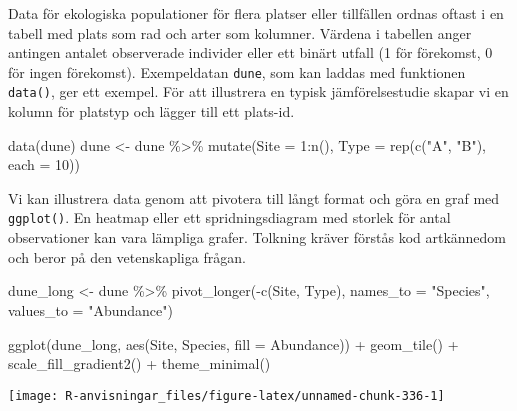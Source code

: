 \documentclass[
]{book}
\newenvironment{Shaded}{\begin{snugshade}}{\end{snugshade}}
\newcommand{\AttributeTok}[1]{\textcolor[rgb]{0.77,0.63,0.00}{#1}}
\newcommand{\DecValTok}[1]{\textcolor[rgb]{0.00,0.00,0.81}{#1}}
\newcommand{\FunctionTok}[1]{\textcolor[rgb]{0.00,0.00,0.00}{#1}}
\newcommand{\NormalTok}[1]{#1}
\newcommand{\OtherTok}[1]{\textcolor[rgb]{0.56,0.35,0.01}{#1}}
\newcommand{\SpecialCharTok}[1]{\textcolor[rgb]{0.00,0.00,0.00}{#1}}
\newcommand{\StringTok}[1]{\textcolor[rgb]{0.31,0.60,0.02}{#1}}
\theoremstyle{definition}
\theoremstyle{definition}
\theoremstyle{definition}
\theoremstyle{definition}
\theoremstyle{remark}
\begin{document}
Data för ekologiska populationer för flera platser eller tillfällen ordnas oftast i en tabell med plats som rad och arter som kolumner. Värdena i tabellen anger antingen antalet observerade individer eller ett binärt utfall (1 för förekomst, 0 för ingen förekomst). Exempeldatan \texttt{dune}, som kan laddas med funktionen \texttt{data()}, ger ett exempel. För att illustrera en typisk jämförelsestudie skapar vi en kolumn för platstyp och lägger till ett plats-id.

\begin{Shaded}
\begin{Highlighting}[]
\FunctionTok{data}\NormalTok{(dune)}
\NormalTok{dune }\OtherTok{\textless{}{-}}\NormalTok{ dune }\SpecialCharTok{\%\textgreater{}\%} 
  \FunctionTok{mutate}\NormalTok{(}\AttributeTok{Site =} \DecValTok{1}\SpecialCharTok{:}\FunctionTok{n}\NormalTok{(), }
         \AttributeTok{Type =} \FunctionTok{rep}\NormalTok{(}\FunctionTok{c}\NormalTok{(}\StringTok{"A"}\NormalTok{, }\StringTok{"B"}\NormalTok{), }\AttributeTok{each =} \DecValTok{10}\NormalTok{))}
\end{Highlighting}
\end{Shaded}

Vi kan illustrera data genom att pivotera till långt format och göra en graf med \texttt{ggplot()}. En heatmap eller ett spridningsdiagram med storlek för antal observationer kan vara lämpliga grafer. Tolkning kräver förstås kod artkännedom och beror på den vetenskapliga frågan.

\begin{Shaded}
\begin{Highlighting}[]
\NormalTok{dune\_long }\OtherTok{\textless{}{-}}\NormalTok{ dune }\SpecialCharTok{\%\textgreater{}\%}
  \FunctionTok{pivot\_longer}\NormalTok{(}\SpecialCharTok{{-}}\FunctionTok{c}\NormalTok{(Site, Type), }\AttributeTok{names\_to =} \StringTok{"Species"}\NormalTok{, }\AttributeTok{values\_to =} \StringTok{"Abundance"}\NormalTok{)}

\FunctionTok{ggplot}\NormalTok{(dune\_long, }\FunctionTok{aes}\NormalTok{(Site, Species, }\AttributeTok{fill =}\NormalTok{ Abundance)) }\SpecialCharTok{+}
  \FunctionTok{geom\_tile}\NormalTok{() }\SpecialCharTok{+}
  \FunctionTok{scale\_fill\_gradient2}\NormalTok{() }\SpecialCharTok{+}
  \FunctionTok{theme\_minimal}\NormalTok{()}
\end{Highlighting}
\end{Shaded}

\begin{center}\texttt{[image: R-anvisningar\_files/figure-latex/unnamed-chunk-336-1]} \end{center}
\end{document}
